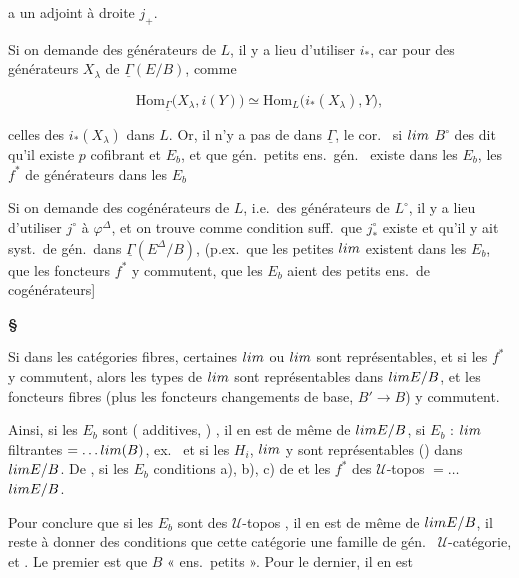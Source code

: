 \documentclass[11pt,a4paper]{article}
\begin{document}
a un adjoint à droite $j_{+}$.

Si on demande des générateurs de $L$, il y a lieu d'utiliser $i_{*}$, car pour
des générateurs $X_{\lambda}$ de $\underline{\Gamma}(E/B)$, comme

\[ \mathrm{Hom}_{\underline{\Gamma}}\bigl(X_{\lambda}, i(Y)\bigr)
   \simeq \mathrm{Hom}_{L}\bigl(i_{*}(X_{\lambda}), Y\bigr), \]

\ill{} celles des $i_{*}(X_{\lambda})$ \ill{} dans $L$. Or, il n'y a pas de
 \ill{} dans $\underline{\Gamma}$, le cor.\ \ill{} \ill{}
si \ill{} $\varinjlim$ \ill{} $B^{\circ}$ des \ill{} dit qu'il existe \ill{}
$p$ cofibrant et \ill{} $E_{b}$, et que \ill{} gén.\ petits ens.\ gén.\ \ill{}
existe dans les $E_{b}$, les $f^{*}$ \ill{} de générateurs dans les $E_{b}$


Si on demande des cogénérateurs de $L$, i.e.\ des générateurs de $L^{\circ}$,
il y a lieu d'utiliser $j^{\circ}$ \ill{} à $\varphi^{\Delta}$, et on trouve
comme condition suff.\ que $j^{\circ}_{*}$ existe et qu'il y ait
 syst.\ de gén.\ dans $\underline{\Gamma}(E^{\Delta}/B)$,
(p.ex.\ que les petites $\varprojlim$ existent dans les $E_{b}$, que les
foncteurs $f^{*}$ y commutent, que les $E_{b}$ aient des petits ens.\ de
cogénérateurs]


\textbf{§} \struck{\ill{}}

Si dans les catégories fibres, certaines  $\varprojlim$ ou
$\varinjlim$ sont représentables, et si les $f^{*}$ y commutent, alors les
 types de $\varprojlim$ sont représentables dans $\varprojlim
E/B$, et les foncteurs fibres (plus \ill{} les foncteurs changements de base,
$B' \to B$) y commutent.

Ainsi, si les $E_{b}$ sont  (\ill{} additives,
) , il en
est de même de $\varprojlim E/B$, si $E_{b}$ \ill{} : $\varprojlim$
filtrantes\ill{} $= \ldots \varprojlim(B)$, ex.\ \ill{} et si les $H_{i}$,
$\varprojlim$ \ill{} y sont représentables (\ill{}) \ill{} dans $\varprojlim
E/B$. De \ill{}, si \ill{} les $E_{b}$ \ill{} conditions a), b), c) de \ill{}
et les $f^{*}$ des \ill{} \ill{} $\mathcal{U}$-topos \ill{} $= \ldots$
$\varprojlim E/B$.

Pour  conclure que si les $E_{b}$ sont des
$\mathcal{U}$-topos , il en est de
même de $\varprojlim E/B$, il reste à donner des conditions \ill{} que cette
catégorie \ill{} une  famille de gén.\ \ill{}
$\mathcal{U}$-catégorie, et \ill{}. Le premier est  \ill{}
que $B$ \ill{} « ens.\ petits ». Pour le dernier, il en est \ill{}
\end{document}
